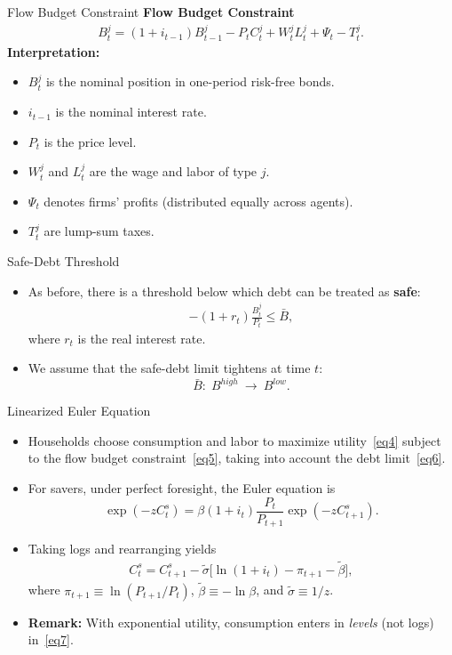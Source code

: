 \documentclass[11pt,aspectratio=169]{beamer}
\begin{document}
\begin{frame}{Flow Budget Constraint}
\small
\textbf{Flow Budget Constraint}
  \begin{align}
    B_t^j
    =(1+i_{t-1})B_{t-1}^j
    -P_t C_t^j
    +W_t^j L_t^j
    +\Psi_t
    -T_t^j.
    \label{eq5}
  \end{align}
\textbf{Interpretation:}
  \begin{itemize}
    \item $B_t^j$ is the nominal position in one-period risk-free bonds.
    \item $i_{t-1}$ is the nominal interest rate.
    \item $P_t$ is the price level.
    \item $W_t^j$ and $L_t^j$ are the wage and labor of type $j$.
    \item $\Psi_t$ denotes firms' profits (distributed equally across agents).
    \item $T_t^j$ are lump-sum taxes.
  \end{itemize}
\end{frame}
\begin{frame}{Safe-Debt Threshold}
\begin{itemize}
  \item As before, there is a threshold below which debt can be treated as \textbf{safe}:
  \begin{align}
    -(1+r_t)\frac{B_t^j}{P_t}\le \bar{B},
    \label{eq6}
  \end{align}
  where $r_t$ is the real interest rate. 
  \item We assume that the safe-debt limit tightens at time $t$:
  \[
    \bar{B}:\; B^{high}\ \longrightarrow\ B^{low}.
  \]
\end{itemize}
\end{frame}

\begin{frame}{Linearized Euler Equation}
\small
\begin{itemize}
  \item Households choose consumption and labor to maximize utility~\eqref{eq4}
  subject to the flow budget constraint~\eqref{eq5}, taking into account the
  debt limit~\eqref{eq6}.
  \vspace{0.3em}
  \item For savers, under perfect foresight, the Euler equation is
  \[
    \exp(-zC_t^s)=\beta(1+i_t)\frac{P_t}{P_{t+1}}\exp(-zC_{t+1}^s).
  \]
  \item Taking logs and rearranging yields
  \begin{align}
    C_t^s
    = C_{t+1}^s
    - \tilde{\sigma}\Big[\ln(1+i_t)-\pi_{t+1}-\tilde{\beta}\Big],
    \label{eq7}
  \end{align}
  where $\pi_{t+1}\equiv \ln(P_{t+1}/P_t)$, $\tilde{\beta}\equiv -\ln\beta$,
  and $\tilde{\sigma}\equiv 1/z$.
  \vspace{0.3em}
  \item \textbf{Remark:} With exponential utility, consumption enters in \emph{levels} (not logs) in~\eqref{eq7}.
\end{itemize}
\end{frame}
\end{document}
